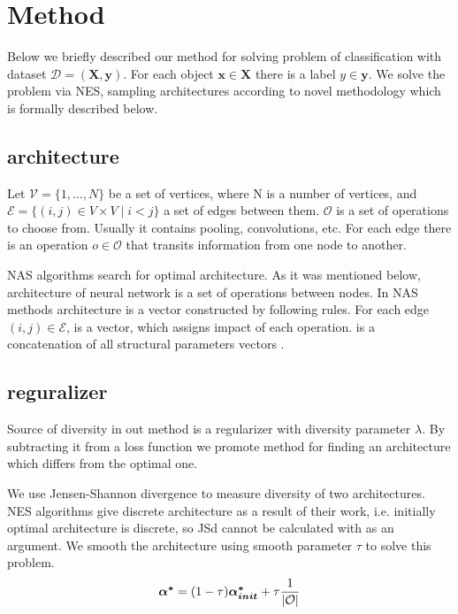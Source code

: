 \documentclass{article}
\begin{document}
\section{Method}

Below we briefly described our method for solving problem of classification with dataset $\mathcal{D} = (\mathbf{X}, \mathbf{y})$. For each object $\mathbf{x} \in \mathbf{X}$ there is a label $y \in \mathbf{y}$. We solve the problem via NES, sampling architectures according to novel methodology which is formally described below.

\subsection{architecture}

Let $\mathcal{V} = \{ 1, \ldots, N \}$ be a set of vertices, where N is a number of vertices, and $\mathcal{E} = \{ (i, j) \in V \times V \mid i < j \}$ a set of edges between them.
$\mathcal{O}$ is a set of operations to choose from. Usually it contains pooling, convolutions, etc.
For each edge there is an operation $o \in \mathcal{O}$ that transits information from one node to another.

NAS algorithms search for optimal architecture. 
As it was mentioned below, architecture of neural network is a set of operations between nodes. In NAS methods architecture is a vector constructed by following rules. For each edge $(i, j) \in \mathcal{E}$, \mbox{} is a vector, which assigns impact of each operation.
\mbox{\boldmath{$\alpha$}} is a concatenation of all structural parameters vectors \mbox{}.

\subsection{reguralizer}

Source of diversity in out method is a regularizer with diversity parameter $\lambda$. By subtracting it from a loss function we promote method for finding an architecture which differs from the optimal one.

We use Jensen-Shannon divergence to measure diversity of two architectures. NES algorithms give discrete architecture as a result of their work, i.e. initially optimal architecture \mbox{} is discrete, so JSd cannot be calculated with \mbox{} as an argument. We smooth the architecture using smooth parameter $\tau$ to solve this problem. 
$$
\mbox{\boldmath{$\alpha^*$}} = (1 - \tau)\mbox{\boldmath{$\alpha_{init}^*$}} + \tau \frac{1}{|\mathcal{O}|}
$$
\end{document}
